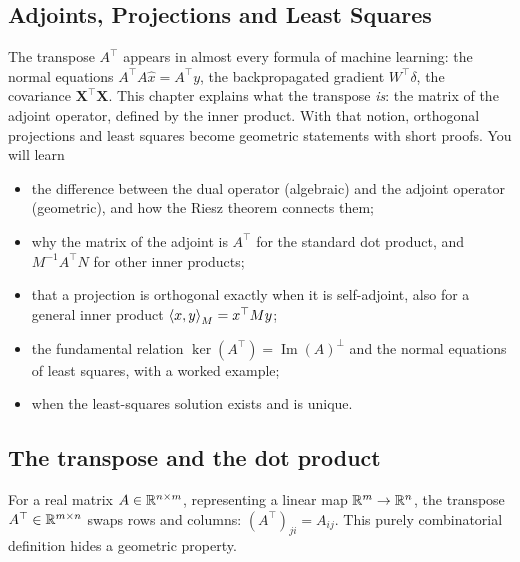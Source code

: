 \begin{notechapter}
\chapter{Adjoints, Projections and Least Squares}\label{ch:adjoint-operator}\label{ch:least-squares-geometry}

\begin{chapterintro}
The transpose $A^\top$ appears in almost every formula of machine learning: the
normal equations $A^\top A\hat x = A^\top y$, the backpropagated gradient
$W^\top\delta$, the covariance $\mathbf X^\top\mathbf X$. This chapter explains what
the transpose \emph{is}: the matrix of the adjoint operator, defined by the inner
product. With that notion, orthogonal projections and least squares become
geometric statements with short proofs. You will learn
\begin{itemize}[nosep]
  \item the difference between the dual operator (algebraic) and the adjoint
        operator (geometric), and how the Riesz theorem connects them;
  \item why the matrix of the adjoint is $A^\top$ for the standard dot product,
        and $M^{-1}A^\top N$ for other inner products;
  \item that a projection is orthogonal exactly when it is self-adjoint, also for
        a general inner product $\left\langle x, y \right\rangle_M = x^\top My$;
  \item the fundamental relation $\ker(A^\top) = \operatorname{Im}(A)^\perp$ and the
        normal equations of least squares, with a worked example;
  \item when the least-squares solution exists and is unique.
\end{itemize}
\end{chapterintro}

\section{The transpose and the dot product}\label{adjoint-operator:sec:transpose}

For a real matrix $A\in\mathbb{R}^{n\times m}$, representing a linear map $\mathbb{R}^m\to\mathbb{R}^n$, the
transpose $A^\top\in\mathbb{R}^{m\times n}$ swaps rows and columns: $(A^\top)_{ji} = A_{ij}$.
This purely combinatorial definition hides a geometric property.


\end{notechapter}
